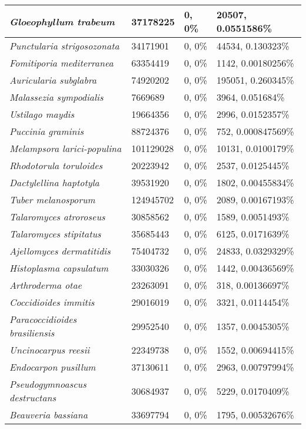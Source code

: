 {\begin{longtable}{| L{4cm} | L{2.7cm}  | L{3.7cm} | L{3.7cm} |}
\textit{Gloeophyllum trabeum} & 37178225 & 0, 0\% & 20507, 0.0551586\% \\ \hline
\textit{Punctularia strigosozonata} & 34171901 & 0, 0\% & 44534, 0.130323\% \\ \hline
\textit{Fomitiporia mediterranea} & 63354419 & 0, 0\% & 1142, 0.00180256\% \\ \hline
\textit{Auricularia subglabra} & 74920202 & 0, 0\% & 195051, 0.260345\% \\ \hline
\textit{Malassezia sympodialis} & 7669689 & 0, 0\% & 3964, 0.051684\% \\ \hline
\textit{Ustilago maydis} & 19664356 & 0, 0\% & 2996, 0.0152357\% \\ \hline
\textit{Puccinia graminis} & 88724376 & 0, 0\% & 752, 0.000847569\% \\ \hline
\textit{Melampsora larici-populina} & 101129028 & 0, 0\% & 10131, 0.0100179\% \\ \hline
\textit{Rhodotorula toruloides} & 20223942 & 0, 0\% & 2537, 0.0125445\% \\ \hline
\textit{Dactylellina haptotyla} & 39531920 & 0, 0\% & 1802, 0.00455834\% \\ \hline
\textit{Tuber melanosporum} & 124945702 & 0, 0\% & 2089, 0.00167193\% \\ \hline
\textit{Talaromyces atroroseus} & 30858562 & 0, 0\% & 1589, 0.0051493\% \\ \hline
\textit{Talaromyces stipitatus} & 35685443 & 0, 0\% & 6125, 0.0171639\% \\ \hline
\textit{Ajellomyces dermatitidis} & 75404732 & 0, 0\% & 24833, 0.0329329\% \\ \hline
\textit{Histoplasma capsulatum} & 33030326 & 0, 0\% & 1442, 0.00436569\% \\ \hline
\textit{Arthroderma otae} & 23263091 & 0, 0\% & 318, 0.00136697\% \\ \hline
\textit{Coccidioides immitis} & 29016019 & 0, 0\% & 3321, 0.0114454\% \\ \hline
\textit{Paracoccidioides brasiliensis} & 29952540 & 0, 0\% & 1357, 0.0045305\% \\ \hline
\textit{Uncinocarpus reesii} & 22349738 & 0, 0\% & 1552, 0.00694415\% \\ \hline
\textit{Endocarpon pusillum} & 37130611 & 0, 0\% & 2963, 0.00797994\% \\ \hline
\textit{Pseudogymnoascus destructans} & 30684937 & 0, 0\% & 5229, 0.0170409\% \\ \hline
\textit{Beauveria bassiana} & 33697794 & 0, 0\% & 1795, 0.00532676\% \\ \hline

\end{longtable}}
